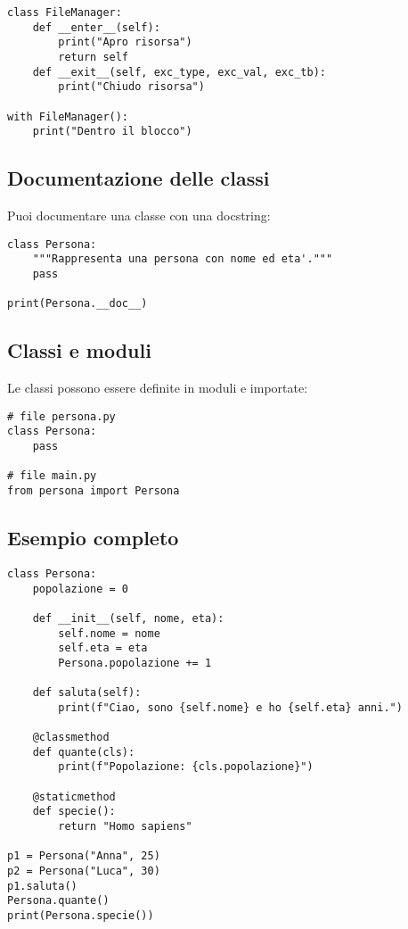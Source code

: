 \documentclass[a4paper,12pt]{article}
\begin{document}
\begin{lstlisting}
class FileManager:
    def __enter__(self):
        print("Apro risorsa")
        return self
    def __exit__(self, exc_type, exc_val, exc_tb):
        print("Chiudo risorsa")

with FileManager():
    print("Dentro il blocco")
\end{lstlisting}

\subsection*{Documentazione delle classi}
Puoi documentare una classe con una docstring:

\begin{lstlisting}
class Persona:
    """Rappresenta una persona con nome ed eta'."""
    pass

print(Persona.__doc__)
\end{lstlisting}

\subsection*{Classi e moduli}
Le classi possono essere definite in moduli e importate:

\begin{lstlisting}
# file persona.py
class Persona:
    pass

# file main.py
from persona import Persona
\end{lstlisting}

\subsection*{Esempio completo}
\begin{lstlisting}
class Persona:
    popolazione = 0

    def __init__(self, nome, eta):
        self.nome = nome
        self.eta = eta
        Persona.popolazione += 1

    def saluta(self):
        print(f"Ciao, sono {self.nome} e ho {self.eta} anni.")

    @classmethod
    def quante(cls):
        print(f"Popolazione: {cls.popolazione}")

    @staticmethod
    def specie():
        return "Homo sapiens"

p1 = Persona("Anna", 25)
p2 = Persona("Luca", 30)
p1.saluta()
Persona.quante()
print(Persona.specie())
\end{lstlisting}
\end{document}
